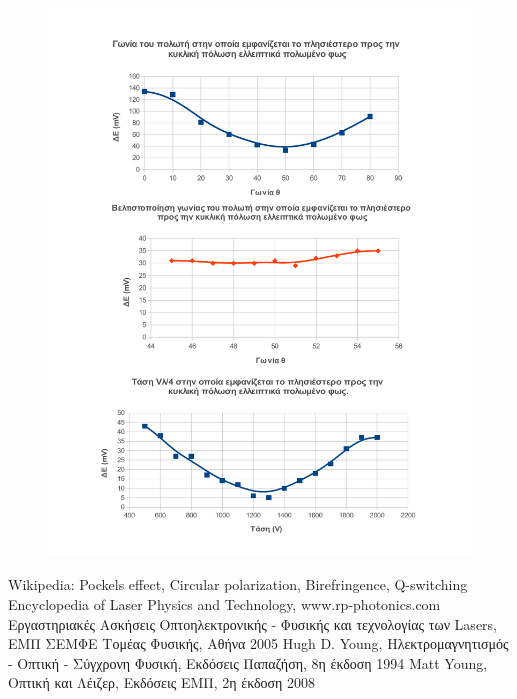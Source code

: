 \documentclass[a4paper,11pt,titlepage]{article}
\begin{document}
\begin{figure} [hp!]
\centering
\includegraphics[width=180mm]{tables.pdf}
\end{figure}

\newpage

\begin{thebibliography}{9}

  Wikipedia: Pockels effect, Circular polarization, Birefringence, Q-switching
 Encyclopedia of Laser Physics and Technology, www.rp-photonics.com
 Εργαστηριακές Ασκήσεις Οπτοηλεκτρονικής - Φυσικής και τεχνολογίας των Lasers, ΕΜΠ ΣΕΜΦΕ Τομέας Φυσικής, Αθήνα 2005
  Hugh D. Young, Ηλεκτρομαγνητισμός - Οπτική - Σύγχρονη Φυσική, Εκδόσεις Παπαζήση, 8η έκδοση 1994 
 Matt Young, Οπτική και Λέιζερ, Εκδόσεις ΕΜΠ, 2η έκδοση 2008 

\end{thebibliography}
\end{document}
